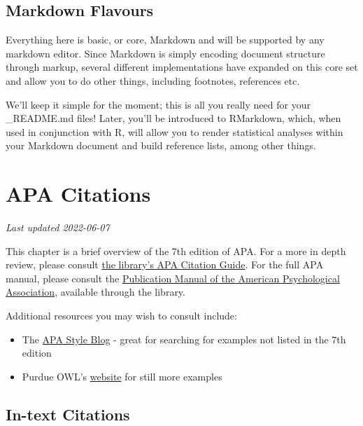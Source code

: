 \documentclass[
]{book}
\providecommand{\tightlist}{%
  \setlength{\itemsep}{0pt}\setlength{\parskip}{0pt}}
\begin{document}
\hypertarget{markdown-flavours}{%
\section{Markdown Flavours}\label{markdown-flavours}}

Everything here is basic, or core, Markdown and will be supported by any markdown editor. Since Markdown is simply encoding document structure through markup, several different implementations have expanded on this core set and allow you to do other things, including footnotes, references etc.

We'll keep it simple for the moment; this is all you really need for your \_README.md files! Later, you'll be introduced to RMarkdown, which, when used in conjunction with R, will allow you to render statistical analyses within your Markdown document and build reference lists, among other things.

\hypertarget{apa-citations}{%
\chapter{APA Citations}\label{apa-citations}}

\emph{Last updated 2022-06-07}

This chapter is a brief overview of the 7th edition of APA. For a more in depth review, please consult \href{https://guides.library.ubc.ca/apacitationstyle}{the library's APA Citation Guide}. For the full APA manual, please consult the \href{http://resolve.library.ubc.ca/cgi-bin/catsearch?bid=10057275}{Publication Manual of the American Psychological Association}, available through the library.

Additional resources you may wish to consult include:

\begin{itemize}
\tightlist
\item
  The \href{https://apastyle.apa.org/blog/}{APA Style Blog} - great for searching for examples not listed in the 7th edition
\item
  Purdue OWL's \href{https://owl.purdue.edu/owl/research_and_citation/apa_style/apa_formatting_and_style_guide/general_format.html}{website} for still more examples
\end{itemize}

\hypertarget{in-text-citations}{%
\section{In-text Citations}\label{in-text-citations}}
\end{document}
